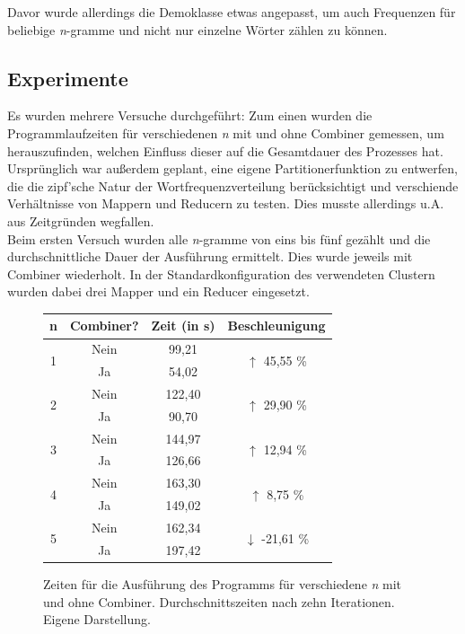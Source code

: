\documentclass[a4paper,12pt]{scrartcl}
\begin{document}
    Davor wurde allerdings die Demoklasse etwas angepasst, um auch Frequenzen für beliebige \emph{n}-gramme und nicht nur einzelne Wörter zählen zu können.

    \subsection{Experimente}

    Es wurden mehrere Versuche durchgeführt: Zum einen wurden die Programmlaufzeiten für verschiedenen \emph{n} mit und ohne Combiner gemessen, um herauszufinden, welchen Einfluss dieser auf die Gesamtdauer des Prozesses hat. Ursprünglich war außerdem geplant, eine eigene Partitionerfunktion zu entwerfen, die die zipf'sche Natur der Wortfrequenzverteilung berücksichtigt und verschiende Verhältnisse von Mappern und Reducern zu testen. Dies musste allerdings u.A. aus Zeitgründen wegfallen. \\

    Beim ersten Versuch wurden alle \emph{n}-gramme von eins bis fünf gezählt und die durchschnittliche Dauer der Ausführung ermittelt. Dies wurde jeweils mit Combiner wiederholt. In der Standardkonfiguration des verwendeten Clustern wurden dabei drei Mapper und ein Reducer eingesetzt.

    \begin{figure}[h]
        \centering
        \begin{tabular}{c|c||c|c}
            n & Combiner? & Zeit (in s) & Beschleunigung\\
            \hline
            \multirow{2}{*}{1} & \textcolor{BrickRed}{Nein} & 99,21 & \multirow{2}{*}{\textcolor{OliveGreen}{$\uparrow$ 45,55 \%}} \\
             & \textcolor{OliveGreen}{Ja} & 54,02 & \\
             \hline
            \multirow{2}{*}{2} & \textcolor{BrickRed}{Nein} & 122,40 & \multirow{2}{*}{\textcolor{OliveGreen}{$\uparrow$ 29,90 \%}} \\
             & \textcolor{OliveGreen}{Ja} & 90,70 & \\
             \hline
             \multirow{2}{*}{3} & \textcolor{BrickRed}{Nein} & 144,97 & \multirow{2}{*}{\textcolor{OliveGreen}{$\uparrow$ 12,94 \%}} \\
             & \textcolor{OliveGreen}{Ja} & 126,66 & \\
             \hline
             \multirow{2}{*}{4} & \textcolor{BrickRed}{Nein} & 163,30 & \multirow{2}{*}{\textcolor{OliveGreen}{$\uparrow$ 8,75 \%}} \\
             & \textcolor{OliveGreen}{Ja} & 149,02 & \\
             \hline
             \multirow{2}{*}{5} & \textcolor{BrickRed}{Nein} & 162,34 & \multirow{2}{*}{\textcolor{BrickRed}{$\downarrow$ -21,61 \%}} \\
             & \textcolor{OliveGreen}{Ja} & 197,42 & \\
        \end{tabular}
        \caption{Zeiten für die Ausführung des Programms für verschiedene \emph{n} mit und ohne Combiner. Durchschnittszeiten nach zehn Iterationen. Eigene Darstellung.}
    \end{figure}
\end{document}
